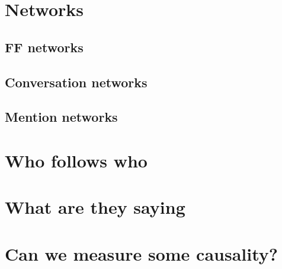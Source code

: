 \documentclass[12]{article}
\begin{document}
\section{Networks}

\subsection{FF networks}

\subsection{Conversation networks}

\subsection{Mention networks}

\section{Who follows who}

\section{What are they saying}

\section{Can we measure some causality?}
\end{document}
